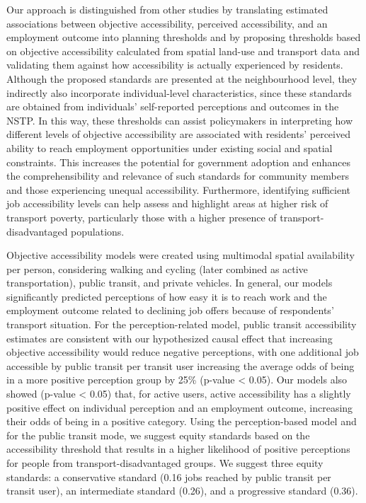 \documentclass[preprint, 3p,
authoryear]{elsarticle} %
\begin{document}
Our approach is distinguished from other studies by translating
estimated associations between objective accessibility, perceived
accessibility, and an employment outcome into planning thresholds and by
proposing thresholds based on objective accessibility calculated from
spatial land-use and transport data and validating them against how
accessibility is actually experienced by residents. Although the
proposed standards are presented at the neighbourhood level, they
indirectly also incorporate individual-level characteristics, since
these standards are obtained from individuals' self-reported perceptions
and outcomes in the NSTP. In this way, these thresholds can assist
policymakers in interpreting how different levels of objective
accessibility are associated with residents' perceived ability to reach
employment opportunities under existing social and spatial constraints.
This increases the potential for government adoption and enhances the
comprehensibility and relevance of such standards for community members
and those experiencing unequal accessibility. Furthermore, identifying
sufficient job accessibility levels can help assess and highlight areas
at higher risk of transport poverty, particularly those with a higher
presence of transport-disadvantaged populations.

Objective accessibility models were created using multimodal spatial
availability per person, considering walking and cycling (later combined
as active transportation), public transit, and private vehicles. In
general, our models significantly predicted perceptions of how easy it
is to reach work and the employment outcome related to declining job
offers because of respondents' transport situation. For the
perception-related model, public transit accessibility estimates are
consistent with our hypothesized causal effect that increasing objective
accessibility would reduce negative perceptions, with one additional job
accessible by public transit per transit user increasing the average
odds of being in a more positive perception group by 25\% (p-value
\textless{} 0.05). Our models also showed (p-value \textless{} 0.05)
that, for active users, active accessibility has a slightly positive
effect on individual perception and an employment outcome, increasing
their odds of being in a positive category. Using the perception-based
model and for the public transit mode, we suggest equity standards based
on the accessibility threshold that results in a higher likelihood of
positive perceptions for people from transport-disadvantaged groups. We
suggest three equity standards: a conservative standard (0.16 jobs
reached by public transit per transit user), an intermediate standard
(0.26), and a progressive standard (0.36).
\end{document}
